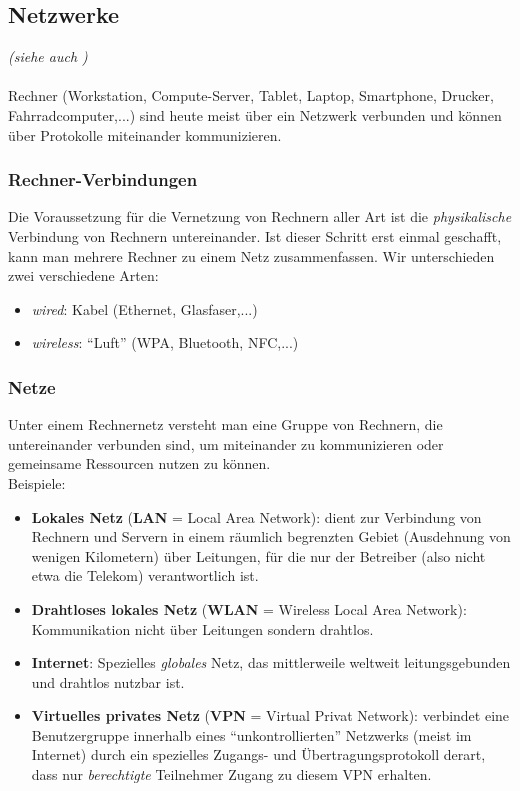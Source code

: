 \subsection{Netzwerke}
\textit{\small(siehe auch \cite[Kap. 3]{gumm2})}\\~\\
Rechner (Workstation, Compute-Server, Tablet, Laptop, Smartphone, Drucker, Fahrradcomputer,...) sind heute meist über ein Netzwerk verbunden und können über Protokolle miteinander kommunizieren.

\subsubsection{Rechner-Verbindungen}
Die Voraussetzung für die Vernetzung von Rechnern aller Art ist die \textit{physikalische} Verbindung von Rechnern untereinander. Ist dieser Schritt erst einmal geschafft, kann man
mehrere Rechner zu einem Netz zusammenfassen.
Wir unterschieden zwei verschiedene Arten:
\begin{itemize}
	\item \textit{wired}: Kabel (Ethernet, Glasfaser,...)
	\item \textit{wireless}: ``Luft'' (WPA, Bluetooth, NFC,...)
\end{itemize}
%
%
%
\subsubsection{Netze}
Unter einem Rechnernetz versteht man eine Gruppe von Rechnern, die untereinander
verbunden sind, um miteinander zu kommunizieren oder gemeinsame Ressourcen
nutzen zu können.\\ Beispiele:
\begin{itemize}
	\item \textbf{Lokales Netz} (\textbf{LAN} = Local Area Network): dient zur Verbindung von Rechnern
	und Servern in einem räumlich begrenzten Gebiet (Ausdehnung von wenigen Kilometern) über Leitungen, für die nur der Betreiber (also
	nicht etwa die Telekom) verantwortlich ist. 
	\item \textbf{Drahtloses lokales Netz} (\textbf{WLAN} = Wireless Local Area
	Network): Kommunikation nicht über Leitungen sondern drahtlos. 
	\item \textbf{Internet}: Spezielles \textit{globales} Netz, das mittlerweile weltweit leitungsgebunden und drahtlos nutzbar ist.
	\item \textbf{Virtuelles privates Netz} (\textbf{VPN} = Virtual Privat Network): verbindet eine Benutzergruppe innerhalb eines ``unkontrollierten'' Netzwerks (meist im Internet) durch ein spezielles Zugangs-	und Übertragungsprotokoll derart, dass nur \textit{berechtigte} Teilnehmer Zugang zu diesem VPN erhalten.
\end{itemize}

